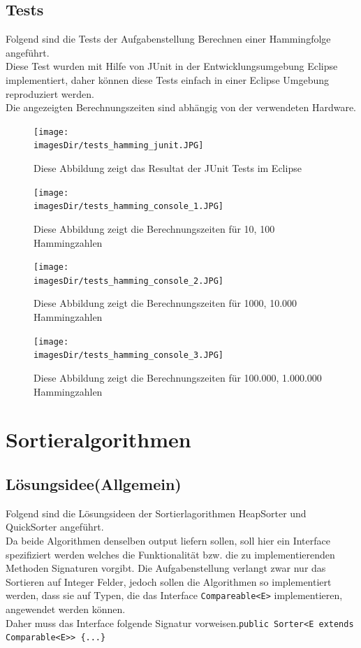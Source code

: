 \documentclass[11pt, a4paper, twoside]{article}   	%
\newcommand{\imagesDir}{images}
\newcommand{\ideaSection}{Lösungsidee}
\newcommand{\testSection}{Tests}
\newcommand{\testCommonText}{Diese Test wurden mit Hilfe von JUnit in der Entwicklungsumgebung Eclipse implementiert, daher können diese Tests einfach in einer Eclipse Umgebung reproduziert werden.\\ 
Die angezeigten Berechnungszeiten sind abhängig von der verwendeten Hardware.}
\newcommand{\inlinecode}{\lstinline[style=inlineSource]}
\begin{document}
\subsection{\testSection}
Folgend sind die Tests der Aufgabenstellung Berechnen einer Hammingfolge angeführt.\\
\testCommonText
\begin{figure}[h]
  \centering
  \texttt{[image: \\imagesDir/tests\_hamming\_junit.JPG]}
  \caption[JUnit Reulstat]
   {Diese Abbildung zeigt das Resultat der JUnit Tests im Eclipse}
\end{figure}
\begin{figure}[h]
  \centering
  \texttt{[image: \\imagesDir/tests\_hamming\_console\_1.JPG]}
  \caption[Konsolenausgabe der Berechnungszeiten]
   {Diese Abbildung zeigt die Berechnungszeiten für 10, 100 Hammingzahlen}
\end{figure}
\newpage
\begin{figure}[h]
  \centering
  \texttt{[image: \\imagesDir/tests\_hamming\_console\_2.JPG]}
  \caption[Konsolenausgabe der Berechnungszeiten]
   {Diese Abbildung zeigt die Berechnungszeiten für 1000, 10.000 Hammingzahlen}
\end{figure}
\newpage
\begin{figure}[h]
  \centering
 \texttt{[image: \\imagesDir/tests\_hamming\_console\_3.JPG]}
  \caption[Konsolenausgabe der Berechnungszeiten]
   {Diese Abbildung zeigt die Berechnungszeiten für 100.000, 1.000.000 Hammingzahlen}
\end{figure}
\newpage
{\color{myred}
	\section
		{Sortieralgorithmen}
}
\subsection{\ideaSection \hspace{2mm}(Allgemein)}
Folgend sind die Lösungsideen der Sortierlagorithmen HeapSorter und QuickSorter angeführt.\\
Da beide Algorithmen denselben output liefern sollen, soll hier ein Interface spezifiziert werden welches die Funktionalität bzw. die zu implementierenden Methoden Signaturen vorgibt. Die Aufgabenstellung verlangt zwar nur das Sortieren auf Integer Felder, jedoch sollen die Algorithmen so implementiert werden, dass sie auf Typen, die das Interface \inlinecode{Compareable<E>} implementieren, angewendet werden können.\\
Daher muss das Interface folgende Signatur vorweisen.\inlinecode|public Sorter<E extends Comparable<E>> {...}|
\newpage
\newpage
\end{document}

